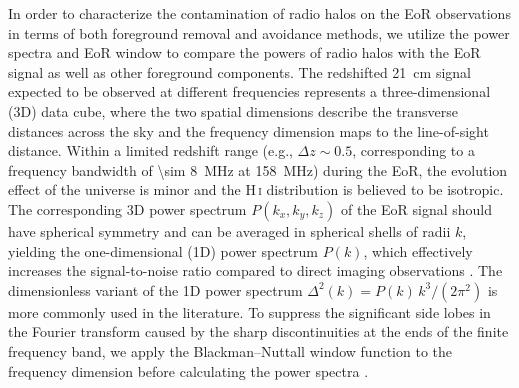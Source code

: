\documentclass[twocolumn]{aastex62}
\newcommand{\Hi}{H\,\textsc{i}}
\begin{document}
In order to characterize the contamination of radio halos on the EoR
observations in terms of both foreground removal and avoidance methods,
we utilize the power spectra and EoR window to compare the powers of
radio halos with the EoR signal as well as other foreground components.
The redshifted 21~cm signal expected to be observed at different
frequencies represents a three-dimensional (3D) data cube, where the
two spatial dimensions describe the transverse distances across the sky
and the frequency dimension maps to the line-of-sight distance.
Within a limited redshift range (e.g., $\Delta z \sim 0.5$, corresponding
to a frequency bandwidth of \SI{\sim 8}{\MHz} at \SI{158}{\MHz})
during the EoR, the evolution effect of the universe is minor and the
\Hi{} distribution is believed to be isotropic.
The corresponding 3D power spectrum $P(k_x, k_y, k_z)$ of the EoR signal
should have spherical symmetry and can be averaged in spherical shells
of radii $k$, yielding the one-dimensional (1D) power spectrum $P(k)$,
which effectively increases the signal-to-noise ratio compared to
direct imaging observations \citep{morales2004,morales2006,datta2010}.
The dimensionless variant of the 1D power spectrum
$\Delta^2(k) = P(k) \,k^3 / (2\pi^2)$
is more commonly used in the literature.
To suppress the significant side lobes in the Fourier transform caused
by the sharp discontinuities at the ends of the finite frequency band,
we apply the Blackman--Nuttall window function to the frequency dimension
before calculating the power spectra \citep[e.g.,][]{trott2015,chapman2016}.
\end{document}
